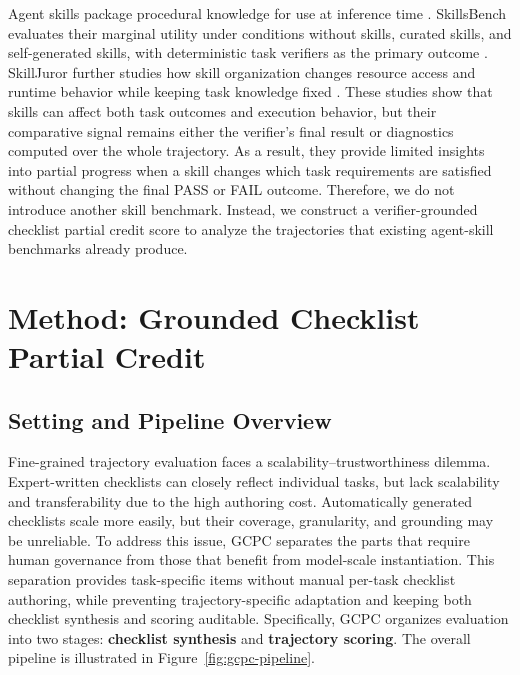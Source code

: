 \documentclass[sigconf,nonacm]{acmart}
\begin{document}
Agent skills package procedural knowledge for use at inference time
\citep{wang2023voyager,xu2026skills,jiang2026sok,skillsurvey2026,li2026ecosystem}. SkillsBench evaluates their marginal
utility under conditions without skills, curated skills, and self-generated skills,
with deterministic task verifiers as the primary outcome
\citep{li2026skillsbench,skillsbench2026granularity}. SkillJuror further studies how skill organization
changes resource access and runtime behavior while keeping task knowledge
fixed \citep{skilljuror2026}. These studies show that skills can affect both task outcomes and execution behavior, but their comparative signal remains either the verifier's final result or diagnostics computed over the whole trajectory. As a result, they provide limited insights into partial progress when a skill changes which task requirements are satisfied without changing the final PASS or FAIL outcome. Therefore, we do not introduce another skill benchmark. Instead, we construct a verifier-grounded checklist partial credit score to analyze the trajectories that existing agent-skill benchmarks already produce.



\section{Method: Grounded Checklist Partial Credit}
\label{sec:method}

\subsection{Setting and Pipeline Overview}
\label{sec:setting}

Fine-grained trajectory evaluation faces a scalability--trustworthiness
dilemma. Expert-written checklists can closely reflect individual tasks, but lack scalability and transferability due to the high authoring cost. Automatically generated checklists scale more easily, but their coverage, granularity, and grounding may be unreliable. To address this issue, GCPC separates the parts
that require human governance from those that benefit from model-scale
instantiation. This separation provides task-specific items without manual per-task checklist authoring, while preventing trajectory-specific adaptation and keeping both checklist synthesis and scoring auditable. Specifically, GCPC organizes evaluation into two stages: \textbf{checklist synthesis} and \textbf{trajectory scoring}. The overall pipeline is illustrated in Figure~\ref{fig:gcpc-pipeline}. 
\end{document}
